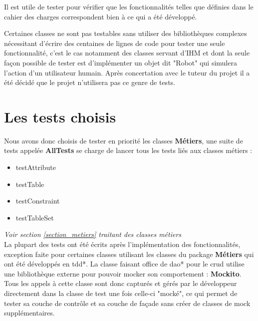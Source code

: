 Il est utile de tester pour vérifier que les fonctionnalités telles que définies dans le cahier des charges correspondent bien à ce qui a été développé.

Certaines classes ne sont pas testables sans utiliser des bibliothèques complexes nécessitant d'écrire des centaines de lignes de code pour tester une seule fonctionnalité, c'est le cas notamment des classes servant d'IHM et dont la seule façon possible de tester est d'implémenter un objet dit "Robot" qui simulera l'action d'un utilisateur humain. Après concertation avec le tuteur du projet il a été décidé que le projet n'utilisera pas ce genre de tests.

\section{Les tests choisis}

Nous avons donc choisis de tester en priorité les classes \textbf{Métiers}, une suite de tests appelée \textbf{AllTests} se charge  de lancer tous les tests liés aux classes métiers :
\\

\begin{itemize}
	\item testAttribute
	\item testTable
	\item testConstraint
	\item testTableSet
\end{itemize}

\textit{Voir section \ref{section_metiers} traitant des classes métiers}
\\


La plupart des tests ont été écrits après l'implémentation des fonctionnalités, exception faite pour certaines classes utilisant les classes du package \textbf{Métiers} qui ont été développés en \gls{tdd}*.
\medbreak
La classe faisant office de \gls{dao}* pour le \gls{crud} utilise une bibliothèque externe pour pouvoir mocker son comportement : \textbf{Mockito}. Tous les appels à cette classe sont donc capturés et gérés par le développeur directement dans la classe de test une fois celle-ci "mocké", ce qui permet de tester sa couche de contrôle et sa couche de façade sans créer de classes de \gls{mock} supplémentaires.

